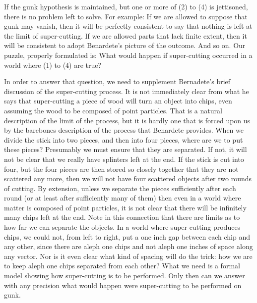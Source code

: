 If the gunk hypothesis is maintained, but one or more of (2) to (4) is jettisoned, there is no problem left to solve. For example: If we are allowed to suppose that gunk may vanish, then it will be perfectly consistent to say that nothing is left at the limit of super-cutting. If we are allowed parts that lack finite extent, then it will be consistent to adopt Benardete's picture of the outcome. And so on. Our puzzle, properly formulated is: What would happen if super-cutting occurred in a world where (1) to (4) are true? 

In order to answer that question, we need to supplement Bernadete's brief discussion of the super-cutting process. It is not immediately clear from what he says that super-cutting a piece of wood will turn an object into chips, even assuming the wood to be composed of point particles. That is a natural description of the limit of the process, but it is hardly one that is forced upon us by the barebones description of the process that Benardete provides. When we divide the stick into two pieces, and then into four pieces, where are we to put these pieces? Presumably we must ensure that they are separated. If not, it will not be clear that we really have splinters left at the end. If the stick is cut into four, but the four pieces are then stored so closely together that they are not scattered any more, then we will not have four scattered objects after two rounds of cutting. By extension, unless we separate the pieces sufficiently after each round (or at least after sufficiently many of them) then even in a world where matter is composed of point particles, it is not clear that there will be infinitely many chips left at the end. Note in this connection that there are limits as to how far we can separate the objects. In a world where super-cutting produces chips, we could not, from left to right, put a one inch gap between each chip and any other, since there are aleph one chips and not aleph one inches of space along any vector. Nor is it even clear what kind of spacing will do the trick: how we are to keep aleph one chips separated from each other? What we need is a formal model showing how super-cutting is to be performed. Only then can we answer with any precision what would happen were super-cutting to be performed on gunk.

